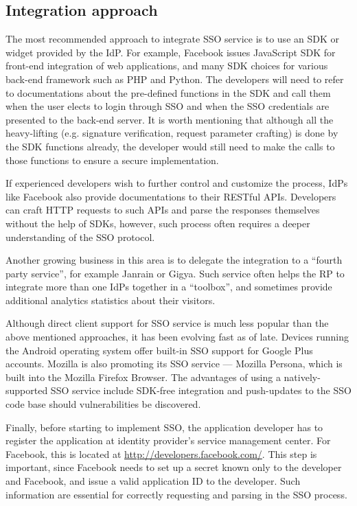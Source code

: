\subsection{Integration approach}

The most recommended approach to integrate SSO service is to use an SDK or widget provided by the IdP.  For example, Facebook issues JavaScript SDK for front-end integration of web applications, and many SDK choices for various back-end framework such as PHP and Python.  The developers will need to refer to documentations about the pre-defined functions in the SDK and call them when the user elects to login through SSO and when the SSO credentials are presented to the back-end server.  It is worth mentioning that although all the heavy-lifting (e.g. signature verification, request parameter crafting) is done by the SDK functions already, the developer would still need to make the calls to those functions to ensure a secure implementation.

If experienced developers wish to further control and customize the process, IdPs like Facebook also provide documentations to their RESTful APIs.  Developers can craft HTTP requests to such APIs and parse the responses themselves without the help of SDKs, however, such process often requires a deeper understanding of the SSO protocol.

Another growing business in this area is to delegate the integration to a ``fourth party service'', for example Janrain or Gigya.  Such service often helps the RP to integrate more than one IdPs together in a ``toolbox'', and sometimes provide additional analytics statistics about their visitors.  

Although direct client support for SSO service is much less popular than the above mentioned approaches, it has been evolving fast as of late.  Devices running the Android operating system offer built-in SSO support for Google Plus accounts.  Mozilla is also promoting its SSO service --- Mozilla Persona, which is built into the Mozilla Firefox Browser.  The advantages of using a natively-supported SSO service include SDK-free integration and push-updates to the SSO code base should vulnerabilities be discovered.

Finally, before starting to implement SSO, the application developer has to register the application at identity provider's service management center.  For Facebook, this is located at \url{http://developers.facebook.com/}.  This step is important, since Facebook needs to set up a secret known only to the developer and Facebook, and issue a valid application ID to the developer.  Such information are essential for correctly requesting and parsing in the SSO process.

